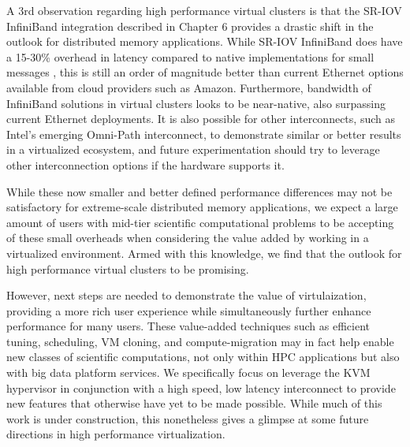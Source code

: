 A 3rd observation regarding high performance virtual clusters is that the SR-IOV InfiniBand integration described in Chapter 6 provides a drastic shift in the outlook for distributed memory applications.  While SR-IOV InfiniBand does have a 15-30\% overhead in latency compared to native implementations for small messages \cite{Musleh2014cloud}, this is still an order of magnitude better than current Ethernet options available from cloud providers such as Amazon. Furthermore, bandwidth of InfiniBand solutions in virtual clusters looks to be near-native, also surpassing current Ethernet deployments.  It is also possible for other interconnects, such as Intel's emerging Omni-Path interconnect, to demonstrate similar or better results in a virtualized ecosystem, and future experimentation should try to leverage other interconnection options if the hardware supports it.  

While these now smaller and better defined performance differences may not be satisfactory for extreme-scale distributed memory applications, we expect a large amount of users with mid-tier scientific computational problems to be accepting of these small overheads when considering the value added by working in a virtualized environment. Armed with this knowledge, we find that the outlook for high performance virtual clusters to be promising.  

However, next steps are needed to demonstrate the value of virtulaization, providing a more rich user experience while simultaneously further enhance performance for many users.  These value-added techniques such as efficient tuning, scheduling, VM cloning, and compute-migration may in fact help enable new classes of scientific computations, not only within HPC applications but also with big data platform services. We specifically focus on leverage the KVM hypervisor in conjunction with a high speed, low latency interconnect to provide new features that otherwise have yet to be made possible.  While much of this work is under construction, this nonetheless gives a glimpse at some future directions in high performance virtualization.     



